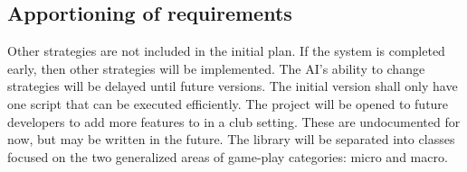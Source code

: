 \subsection{Apportioning of requirements}
Other strategies are not included in the initial plan. If the system is completed early, then other strategies will be implemented.
The AI's ability to change strategies will be delayed until future versions. The initial version shall only have one script that can be executed efficiently.
The project will be opened to future developers to add more features to in a club setting. These are undocumented for now, but may be written in the future. The library will be separated into classes focused on the two generalized areas of game-play categories: micro and macro.

